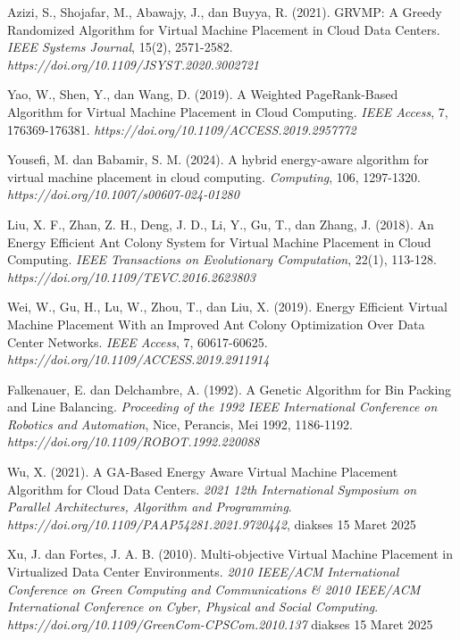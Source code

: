 \begin{thebibliography}{99}
	Azizi, S., Shojafar, M., Abawajy, J., dan Buyya, R. (2021). GRVMP: A Greedy Randomized Algorithm for Virtual Machine Placement in Cloud Data Centers. \textit{IEEE Systems Journal}, 15(2), 2571-2582. \textit{https://doi.org/10.1109/JSYST.2020.3002721}
	
	Yao, W., Shen, Y., dan Wang, D. (2019). A Weighted PageRank-Based Algorithm for Virtual Machine Placement in Cloud Computing. \textit{IEEE Access}, 7, 176369-176381. \textit{https://doi.org/10.1109/ACCESS.2019.2957772}
	
	Yousefi, M. dan Babamir, S. M. (2024). A hybrid energy-aware algorithm for virtual machine placement in cloud computing. \textit{Computing}, 106, 1297-1320. \textit{https://doi.org/10.1007/s00607-024-01280}
	
	Liu, X. F., Zhan, Z. H., Deng, J. D., Li, Y., Gu, T., dan Zhang, J. (2018). An Energy Efficient Ant Colony System for Virtual Machine Placement in Cloud Computing. \textit{IEEE Transactions on Evolutionary Computation}, 22(1), 113-128. \textit{https://doi.org/10.1109/TEVC.2016.2623803}
	
	Wei, W., Gu, H., Lu, W., Zhou, T., dan Liu, X. (2019). Energy Efficient Virtual Machine Placement With an Improved Ant Colony Optimization Over Data Center Networks. \textit{IEEE Access}, 7, 60617-60625. \textit{https://doi.org/10.1109/ACCESS.2019.2911914} 
	
	Falkenauer, E. dan Delchambre, A. (1992). A Genetic Algorithm for Bin Packing and Line Balancing. \textit{Proceeding of the 1992 IEEE International Conference on Robotics and Automation}, Nice, Perancis, Mei 1992, 1186-1192. \textit{https://doi.org/10.1109/ROBOT.1992.220088}
	
	Wu, X. (2021). A GA-Based Energy Aware Virtual Machine Placement Algorithm for Cloud Data Centers. \textit{2021 12th International Symposium on Parallel Architectures, Algorithm and Programming}. \textit{https://doi.org/10.1109/PAAP54281.2021.9720442}, diakses 15 Maret 2025
	
	Xu, J. dan Fortes, J. A. B. (2010). Multi-objective Virtual Machine Placement in Virtualized Data Center Environments. \textit{2010 IEEE/ACM International Conference on Green Computing and Communications & 2010 IEEE/ACM International Conference on Cyber, Physical and Social Computing}. \textit{https://doi.org/10.1109/GreenCom-CPSCom.2010.137} diakses 15 Maret 2025
	

\end{thebibliography}
